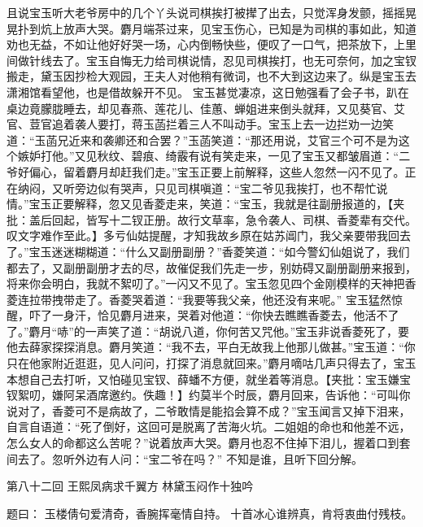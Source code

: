 \documentclass[12pt,oneside]{book}
\begin{document}
且说宝玉听大老爷房中的几个丫头说司棋挨打被撵了出去，只觉浑身发颤，摇摇晃晃扑到炕上放声大哭。麝月端茶过来，见宝玉伤心，已知是为司棋的事如此，知道劝也无益，不如让他好好哭一场，心内倒畅快些，便叹了一口气，把茶放下，上里间做针线去了。宝玉自悔无力给司棋说情，忍见司棋挨打，也无可奈何，加之宝钗搬走，黛玉因抄检大观园，王夫人对他稍有微词，也不大到这边来了。纵是宝玉去潇湘馆看望他，也是借故躲开不见。
宝玉甚觉凄凉，这日勉强看了会子书，趴在桌边竟朦胧睡去，却见春燕、莲花儿、佳蕙、蝉姐进来倒头就拜，又见葵官、艾官、荳官追着袭人要打，蒋玉菡拦着三人不叫动手。宝玉上去一边拦劝一边笑道：“玉菡兄近来和袭卿还和合罢？”玉菡笑道：“那还用说，艾官三个可不是为这个嫉妒打他。”又见秋纹、碧痕、绮霰有说有笑走来，一见了宝玉又都皱眉道：“二爷好偏心，留着麝月却赶我们走。”宝玉正要上前解释，这些人忽然一闪不见了。正在纳闷，又听旁边似有哭声，只见司棋嗔道：“宝二爷见我挨打，也不帮忙说情。”宝玉正要解释，忽又见香菱走来，笑道：“宝玉，我就是往副册报道的，【夹批：盖后回起，皆写十二钗正册。故行文草率，急令袭人、司棋、香菱辈有交代。叹文字难作至此。】多亏仙姑提醒，才知我故乡原在姑苏阊门，我父亲要带我回去了。”宝玉迷迷糊糊道：“什么又副册副册？”香菱笑道：“如今警幻仙姐说了，我们都去了，又副册副册才去的尽，故催促我们先走一步，别妨碍又副册副册来报到，将来你会明白，我就不絮叨了。”一闪又不见了。宝玉忽见四个金刚模样的天神把香菱连拉带拽带走了。香菱哭着道：“我要等我父亲，他还没有来呢。”
宝玉猛然惊醒，吓了一身汗，恰见麝月进来，哭着对他道：“你快去瞧瞧香菱去，他活不了了。”麝月“哧”的一声笑了道：“胡说八道，你何苦又咒他。”宝玉非说香菱死了，要他去薛家探探消息。麝月笑道：“我不去，平白无故我上他那儿做甚。”宝玉道：“你只在他家附近逛逛，见人问问，打探了消息就回来。”麝月嘀咕几声只得去了，宝玉本想自己去打听，又怕碰见宝钗、薛蟠不方便，就坐着等消息。【夹批：宝玉嫌宝钗絮叨，嫌阿呆酒席邀约。佚趣！】约莫半个时辰，麝月回来，告诉他：“可叫你说对了，香菱可不是病故了，二爷敢情是能掐会算不成？”宝玉闻言又掉下泪来，自言自语道：“死了倒好，这回可是脱离了苦海火坑。二姐姐的命也和他差不远，怎么女人的命都这么苦呢？”说着放声大哭。麝月也忍不住掉下泪儿，握着口到套间去了。忽听外边有人问：“宝二爷在吗？”
不知是谁，且听下回分解。

 
第八十二回 王熙凤病求千翼方 林黛玉闷作十独吟
 
题曰：
玉楼倩句爱清奇，香腕挥毫情自持。
十首冰心谁辨真，肯将衷曲付残枝。
\end{document}
